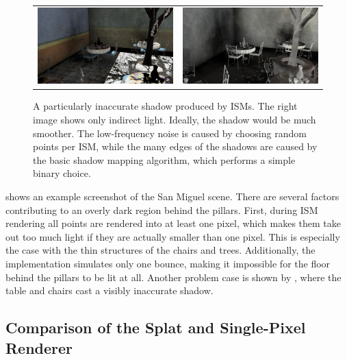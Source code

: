 \begin{figure}[htb]
\centering
  \begin{tabular}{@{}cc@{}}
    \includegraphics[width=.48\textwidth]{screenshots/san_miguel_ugly_shadow} &
    \includegraphics[width=.48\textwidth]{screenshots/san_miguel_ugly_shadow_gi_only}
  \end{tabular}
  \caption{A particularly inaccurate shadow produced by ISMs. The right image shows only indirect light. Ideally, the shadow would be much smoother. The low-frequency noise is caused by choosing random points per ISM, while the many edges of the shadows are caused by the basic shadow mapping algorithm, which performs a simple binary choice.}
  \label{fig:results:san_miguel_ugly_shadow}
\end{figure}

 shows an example screenshot of the San Miguel scene. There are several factors contributing to an overly dark region behind the pillars. First, during ISM rendering all points are rendered into at least one pixel, which makes them take out too much light if they are actually smaller than one pixel. This is especially the case with the thin structures of the chairs and trees. Additionally, the implementation simulates only one bounce, making it impossible for the floor behind the pillars to be lit at all. Another problem case is shown by , where the table and chairs cast a visibly inaccurate shadow.


\subsection{Comparison of the Splat and Single-Pixel Renderer}
\label{sec:results:ism:comparison}

